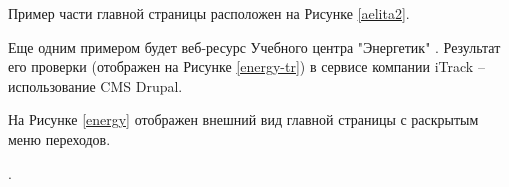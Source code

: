 
Пример части главной страницы расположен на Рисунке \ref{aelita2}.


Еще одним примером будет веб-ресурс Учебного центра "Энергетик" \cite{energy}.
Результат его проверки (отображен на Рисунке \ref{energy-tr}) в сервисе компании iTrack -- использование CMS Drupal.


На Рисунке \ref{energy} отображен внешний вид главной страницы с раскрытым меню переходов.

.


\clearpage

